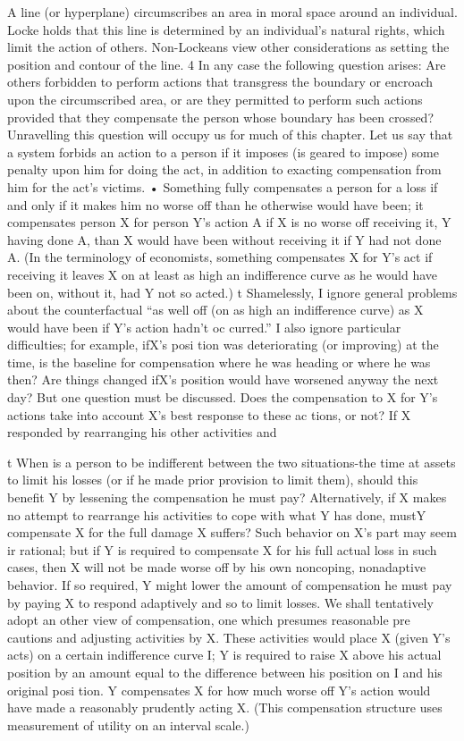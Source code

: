 \documentclass[11pt,openany]{book}
\begin{document}
A line (or hyperplane) circumscribes an area in moral space around an individual. Locke holds that this line is determined by an individual's natural rights, which limit the action of others. Non-Lockeans view other considerations as setting the position and contour of the line. 4 In any case the following question arises: Are others forbidden to perform actions that transgress the boundary or encroach upon the circumscribed area, or are they permitted to perform such actions provided that they compensate the person whose boundary has been crossed? Unravelling this question will occupy us for much of this chapter. Let us say that a system forbids an action to a person if it imposes (is geared to impose) some penalty upon him for doing the act, in addition to exacting compensation from him for the act's victims. • Something fully compensates a person for a loss if and only if it makes him no worse off than he otherwise would have been; it compensates person X for person Y's action A if X is no worse off receiving it, Y having done A, than X would have been without receiving it if Y had not done A. (In the terminology of economists, something compensates X for Y's act if receiving it leaves X on at least as high an indifference curve as he would have been on, without it, had Y not so acted.) t Shamelessly, I ignore general problems about the counterfactual ``as well off (on as high an indifference curve) as X would have been if Y's action hadn't oc curred.'' I also ignore particular difficulties; for example, ifX's posi tion was deteriorating (or improving) at the time, is the baseline for compensation where he was heading or where he was then? Are things changed ifX's position would have worsened anyway the next day? But one question must be discussed. Does the compensation to X for Y's actions take into account X's best response to these ac tions, or not? If X responded by rearranging his other activities and 

t When is a person to be indifferent between the two situations-the time at assets to limit his losses (or if he made prior provision to limit them), should this benefit Y by lessening the compensation he must pay? Alternatively, if X makes no attempt to rearrange his activities to cope with what Y has done, mustY compensate X for the full damage X suffers? Such behavior on X's part may seem ir rational; but if Y is required to compensate X for his full actual loss in such cases, then X will not be made worse off by his own noncoping, nonadaptive behavior. If so required, Y might lower the amount of compensation he must pay by paying X to respond adaptively and so to limit losses. We shall tentatively adopt an other view of compensation, one which presumes reasonable pre cautions and adjusting activities by X. These activities would place X (given Y's acts) on a certain indifference curve I; Y is required to raise X above his actual position by an amount equal to the difference between his position on I and his original posi tion. Y compensates X for how much worse off Y's action would have made a reasonably prudently acting X. (This compensation structure uses measurement of utility on an interval scale.) 
\end{document}
